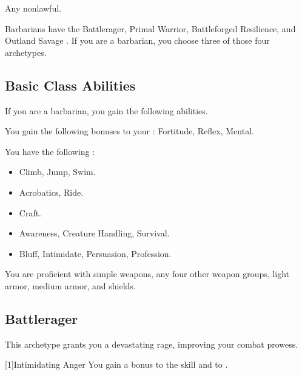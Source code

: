      Any nonlawful.

     Barbarians have the Battlerager, Primal Warrior, Battleforged Resilience, and Outland Savage .
    If you are a barbarian, you choose three of those four archetypes.

    \subsection{Basic Class Abilities}
        If you are a barbarian, you gain the following abilities.

        You gain the following bonuses to your :  Fortitude,  Reflex,  Mental.

        You have the following :
        \begin{itemize}
            \item {} Climb, Jump, Swim.
            \item {} Acrobatics, Ride.
            \item {} Craft.
            \item {} Awareness, Creature Handling, Survival.
            \item {} Bluff, Intimidate, Persuasion, Profession.
        \end{itemize}

        You are proficient with simple weapons, any four other weapon groups, light armor, medium armor, and shields.

    \subsection{Battlerager}\label{Rage}
        This archetype grants you a devastating rage, improving your combat prowess.

        [1]{Intimidating Anger}
        You gain a  bonus to the  skill and to .

